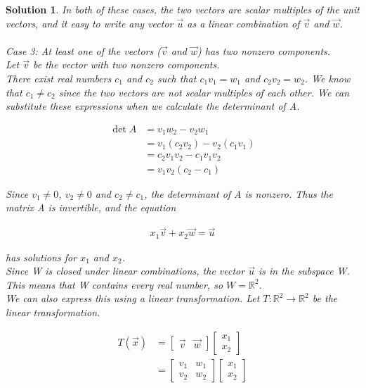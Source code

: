 \documentclass{article}
\newtheorem*{solution}{Solution}
\begin{document}
\begin{solution}
In both of these cases, the two vectors are scalar multiples of the unit vectors, and it easy to write any vector $\vec{u}$ as a linear combination of $\vec{v}$ and $\vec{w}$. \\
\\
\emph{Case 3: } At least one of the vectors ($\vec{v}$ and $\vec{w}$) has two nonzero components. \\

Let $\vec{v}$ be the vector with two nonzero components. \\

There exist real numbers $c_{1}$ and $c_{2}$ such that $c_{1} v_{1} = w_{1}$ and $c_{2} v_{2} = w_{2}$. We know that $c_{1} \neq c_{2}$ since the two vectors are not scalar multiples of each other. We can substitute these expressions when we calculate the determinant of A.

\begin{align*}
\det A &= v_{1} w_{2} - v_{2} w_{1} \\
&= v_{1} (c_{2} v_{2}) - v_{2} (c_{1} v_{1}) \\
&= c_{2} v_{1} v_{2} - c_{1} v_{1} v_{2} \\
&= v_{1} v_{2}  (c_{2} - c_{1}) 
\end{align*} 

Since $v_{1} \neq 0$, $v_{2} \neq 0$ and $c_{2} \neq c_{1}$, the determinant of A is nonzero. Thus the matrix A is invertible, and the equation 

\begin{align*}
x_{1} \vec{v} + x_{2} \vec{w} = \vec{u}
\end{align*}

has solutions for $x_{1}$ and $x_{2}$. \\

Since W is closed under linear combinations, the vector $\vec{u}$ is in the subspace W. This means that W contains every real number, so $W = \mathbb{R}^2$. \\

We can also express this using a linear transformation. Let $T : \mathbb{R}^2 \to \mathbb{R}^2$ be the linear transformation.

\begin{align*}
T(\vec{x}) &= \begin{bmatrix} \vec{v} & \vec{w} \end{bmatrix} \begin{bmatrix} x_{1} \\ x_{2} \end{bmatrix} \\
&= \begin{bmatrix} v_{1} & w_{1} \\ v_{2} & w_{2} \end{bmatrix} \begin{bmatrix} x_{1} \\ x_{2} \end{bmatrix}
\end{align*}


\end{solution}
\end{document}
